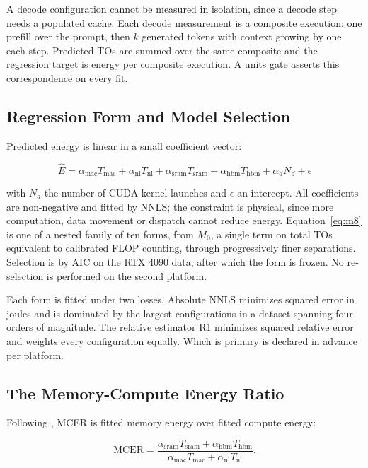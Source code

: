\documentclass[conference]{IEEEtran}
\begin{document}
A decode configuration cannot be measured in isolation, since a decode step
needs a populated cache. Each decode measurement is a composite execution:
one prefill over the prompt, then $k$ generated tokens with context growing
by one each step. Predicted TOs are summed over the same composite and the
regression target is energy per composite execution. A units gate asserts
this correspondence on every fit.

\subsection{Regression Form and Model Selection}

Predicted energy is linear in a small coefficient vector:

\begin{equation}
\hat{E} = \alpha_{\mathrm{mac}} T_{\mathrm{mac}}
        + \alpha_{\mathrm{nl}} T_{\mathrm{nl}}
        + \alpha_{\mathrm{sram}} T_{\mathrm{sram}}
        + \alpha_{\mathrm{hbm}} T_{\mathrm{hbm}}
        + \alpha_{d} N_{d} + \epsilon
\label{eq:m8}
\end{equation}

with $N_d$ the number of CUDA kernel launches and $\epsilon$ an intercept.
All coefficients are non-negative and fitted by NNLS; the constraint is
physical, since more computation, data movement or dispatch cannot reduce
energy. Equation~\ref{eq:m8} is one of a nested family of ten forms, from
$M_0$, a single term on total TOs equivalent to calibrated FLOP counting,
through progressively finer separations. Selection is by AIC on the RTX
4090 data, after which the form is frozen. No re-selection is performed on
the second platform.

Each form is fitted under two losses. Absolute NNLS minimizes squared error
in joules and is dominated by the largest configurations in a dataset
spanning four orders of magnitude. The relative estimator R1 minimizes
squared relative error and weights every configuration equally. Which is
primary is declared in advance per platform.

\subsection{The Memory-Compute Energy Ratio}

Following \cite{toml2026flairs}, MCER is fitted memory energy over fitted
compute energy:

\begin{equation}
\mathrm{MCER} =
\frac{\alpha_{\mathrm{sram}} T_{\mathrm{sram}} + \alpha_{\mathrm{hbm}} T_{\mathrm{hbm}}}
     {\alpha_{\mathrm{mac}} T_{\mathrm{mac}} + \alpha_{\mathrm{nl}} T_{\mathrm{nl}}} .
\label{eq:mcer}
\end{equation}
\end{document}
